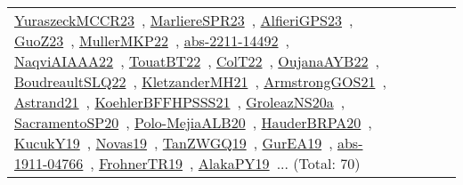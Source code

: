 {\begin{longtable}{lp{3cm}>{\raggedright\arraybackslash}p{6cm}>{\raggedright\arraybackslash}p{6cm}>{\raggedright\arraybackslash}p{8cm}}
\href{../works/YuraszeckMCCR23.pdf}{YuraszeckMCCR23}~\cite{YuraszeckMCCR23}, \href{../works/MarliereSPR23.pdf}{MarliereSPR23}~\cite{MarliereSPR23}, \href{../works/AlfieriGPS23.pdf}{AlfieriGPS23}~\cite{AlfieriGPS23}, \href{../works/GuoZ23.pdf}{GuoZ23}~\cite{GuoZ23}, \href{../works/MullerMKP22.pdf}{MullerMKP22}~\cite{MullerMKP22}, \href{../works/abs-2211-14492.pdf}{abs-2211-14492}~\cite{abs-2211-14492}, \href{../works/NaqviAIAAA22.pdf}{NaqviAIAAA22}~\cite{NaqviAIAAA22}, \href{../works/TouatBT22.pdf}{TouatBT22}~\cite{TouatBT22}, \href{../works/ColT22.pdf}{ColT22}~\cite{ColT22}, \href{../works/OujanaAYB22.pdf}{OujanaAYB22}~\cite{OujanaAYB22}, \href{../works/BoudreaultSLQ22.pdf}{BoudreaultSLQ22}~\cite{BoudreaultSLQ22}, \href{../works/KletzanderMH21.pdf}{KletzanderMH21}~\cite{KletzanderMH21}, \href{../works/ArmstrongGOS21.pdf}{ArmstrongGOS21}~\cite{ArmstrongGOS21}, \href{../works/Astrand21.pdf}{Astrand21}~\cite{Astrand21}, \href{../works/KoehlerBFFHPSSS21.pdf}{KoehlerBFFHPSSS21}~\cite{KoehlerBFFHPSSS21}, \href{../works/GroleazNS20a.pdf}{GroleazNS20a}~\cite{GroleazNS20a}, \href{../works/SacramentoSP20.pdf}{SacramentoSP20}~\cite{SacramentoSP20}, \href{../works/Polo-MejiaALB20.pdf}{Polo-MejiaALB20}~\cite{Polo-MejiaALB20}, \href{../works/HauderBRPA20.pdf}{HauderBRPA20}~\cite{HauderBRPA20}, \href{../works/KucukY19.pdf}{KucukY19}~\cite{KucukY19}, \href{../works/Novas19.pdf}{Novas19}~\cite{Novas19}, \href{../works/TanZWGQ19.pdf}{TanZWGQ19}~\cite{TanZWGQ19}, \href{../works/GurEA19.pdf}{GurEA19}~\cite{GurEA19}, \href{../works/abs-1911-04766.pdf}{abs-1911-04766}~\cite{abs-1911-04766}, \href{../works/FrohnerTR19.pdf}{FrohnerTR19}~\cite{FrohnerTR19}, \href{../works/AlakaPY19.pdf}{AlakaPY19}~\cite{AlakaPY19}... (Total: 70)\\

\end{longtable}}
